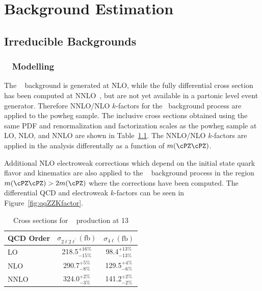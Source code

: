 \chapter{Background Estimation}

\section{Irreducible Backgrounds}
\label{sec:irrbkgd}

\subsection{\qqZZ~ Modelling}
\label{sec:redbkgd}

The \qqZZ~ background is generated at NLO, while the fully differential cross section has been computed at 
NNLO~\cite{Grazzini2015407}, but are not yet available in a partonic level event generator. Therefore NNLO/NLO 
$k$-factors for the \qqZZ~background process are applied to the {\sc powheg} sample. The inclusive cross 
sections obtained using the same PDF and renormalization and factorization scales as the {\sc powheg} sample
at LO, NLO, and NNLO are shown in Table~\ref{tab:qqZZXS}. The NNLO/NLO $k$-factors are applied in the analysis
differentally as a function of $m(\cPZ\cPZ)$. 

Additional NLO electroweak corrections which depend on the initial state quark flavor and kinematics
are also applied to the \qqZZ~ background process in the region $m(\cPZ \cPZ)>2m(\cPZ)$ where the 
corrections have been computed. The differential QCD and electroweak $k$-factors can be seen in 
Figure~\ref{fig:qqZZKfactor}.

\begin{table}[h]
    \centering
    \begin{tabular}{|l|c|c|} 
\hline %
QCD Order  & $\sigma_{2\ell2\ell^{\prime}} (\mathrm{fb})$  & $\sigma_{4\ell} (\mathrm{fb})$  \\
\hline %
LO    & 218.5$^{+16\%}_{-15\%}$ & 98.4$^{+13\%}_{-13\%}$ \\
NLO   & 290.7$^{+5\%}_{-8\%}$   & 129.5$^{+4\%}_{-6\%}$ \\
NNLO  & 324.0$^{+2\%}_{-3\%}$   & 141.2$^{+2\%}_{-2\%}$ \\
\hline %
    \end{tabular}
    \caption{Cross sections for \qqZZ~ production at 13 \TeV}
    \label{tab:qqZZXS}
\end{table}

